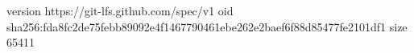 version https://git-lfs.github.com/spec/v1
oid sha256:fda8fc2de75febb89092e4f1467790461ebe262e2baef6f88d85477fe2101df1
size 65411
